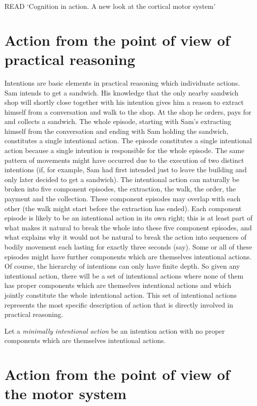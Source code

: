 \documentclass[12pt,a4paper]{extarticle}
\begin{document}
READ `Cognition in action. A new look at the cortical motor system'

\section{Action from the point of view of practical reasoning}

Intentions are basic elements in practical reasoning which individuate actions.
Sam intends to get a sandwich.
His knowledge that the only nearby sandwich shop will shortly close together with his intention gives him a reason to extract himself from a conversation and walk to the shop.
At the shop he orders, pays for and collects a sandwich.
The whole episode, starting with Sam's extracting himself from the conversation and ending with Sam holding the sandwich, constitutes a single intentional action.
The episode constitutes a single intentional action because a single intention is responsible for the whole episode.  
The same pattern of movements might have occurred due to the execution of two distinct intentions (if, for example, Sam had first intended just to leave the building and only later decided to get a sandwich).
The intentional action can naturally be broken into five component episodes, the extraction, the walk, the order, the payment and the collection.  
These component episodes may overlap with each other (the walk might start before the extraction has ended).  
Each component episode is likely to be an intentional action in its own right; this is at least part of what makes it natural to break the whole into these five component episodes, and what explains why it would not be natural to break the action into sequences of bodily movement each lasting for exactly three seconds (say).
Some or all of these episodes might have further components which are themselves intentional actions.
Of course, the hierarchy of intentions can only have finite depth.  So given any intentional action, there will be a set of intentional actions where none of them has proper components which are themselves intentional actions and which jointly constitute the whole intentional action.
This set of intentional actions represents the most specific description of action that is directly involved in practical reasoning.

Let a \emph{minimally intentional action} be an intention action with no proper components which are themselves intentional actions.


\section{Action from the point of view of the motor system}
\end{document}
